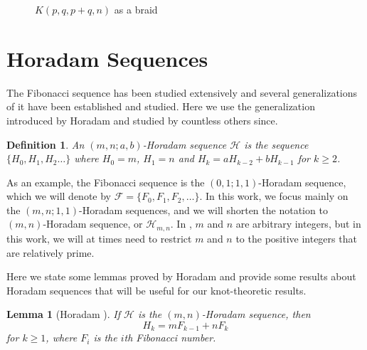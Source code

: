 \documentclass{amsart}
\newtheorem{lemma}{Lemma}
\newtheorem{defn}{Definition}
\begin{document}
\begin{center}
\begin{figure}[ht]
	\caption{$K(p,q,p+q, n)$ as a braid}\label{fig:r=p+qbraid}
\end{figure}
\end{center}


\section{Horadam Sequences}\label{Horadam}

The Fibonacci sequence has been studied extensively and several generalizations of it have been established and studied. Here we use the generalization introduced by Horadam \cite{Horadam2} and studied by countless others since.

\begin{defn}
An $(m, n; a,b)$-Horadam sequence $\mathcal H$ is the sequence $\{ H_0, H_1, H_2 \ldots \}$ where $H_0 = m$, $H_1 = n$ and $H_k = aH_{k-2}+bH_{k-1}$ for $k \ge 2$. \end{defn}

As an example, the Fibonacci sequence is the $(0,1; 1,1)$-Horadam sequence, which we will denote by $\mathcal F = \{ F_0, F_1, F_2, \ldots \}$. In this work, we focus mainly on the $(m,n; 1, 1)$-Horadam sequences, and we will shorten the notation to $(m,n)$-Horadam sequence, or $\mathcal H_{m,n}$. In \cite{Horadam2}, $m$ and $n$ are arbitrary integers, but in this work, we will at times need to restrict $m$ and $n$ to the positive integers that are relatively prime.


Here we state some lemmas proved by Horadam \cite{Horadam1} and provide some results about Horadam sequences that will be useful for our knot-theoretic results.



\begin{lemma}[Horadam \cite{Horadam1}]\label{lem:seq}
If $\mathcal H$ is the $(m,n)$-Horadam sequence, then $$H_k = mF_{k-1} + nF_k$$ for $k \ge 1$, where $F_i$ is the $i$th Fibonacci number.
\end{lemma}
\end{document}
